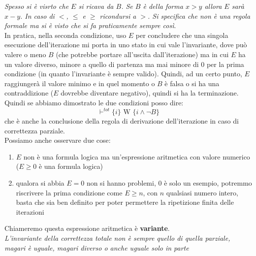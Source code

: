 \documentclass[a4paper,12pt, oneside]{book}
\begin{document}
\textit{Spesso si è visrto che $E$ si ricava da $B$. Se $B$ è della forma $x>y$ 
allora $E$ sarà $x-y$. In caso di $<$, $\leq$ e $\geq$ ricondursi a $>$. Si 
specifica che non è una regola formale ma si è visto che si fa praticamente 
sempre così}.\\
In pratica, nella seconda condizione, uso $E$ per concludere che una singola
esecuzione dell'iterazione mi porta in uno stato in cui vale l'invariante, dove
può valere o meno $B$ (che potrebbe portare all'uscita dall'iterazione) ma in
cui $E$ ha un valore diverso, minore a quello di partenza ma mai minore di 0 per
la prima condizione (in quanto l'invariante è sempre valido). Quindi, ad un
certo punto, $E$ raggiungerà il valore minimo e in quel momento o $B$ è falsa o
si ha una contraddizione ($E$ dovrebbe diventare negativo), quindi si ha la
terminazione. \\
Quindi se abbiamo dimostrato le due condizioni posso dire:
\[\vdash^{tot}\{i\}\mbox{ W }\{i\land\neg B\}\]
che è anche la conclusione della regola di derivazione dell'iterazione in caso
di correttezza parziale.\\
Possiamo anche osservare due cose:
\begin{enumerate}
  \item $E$ non è una formula logica ma un'espressione aritmetica con valore
  numerico ($E\geq 0$ è una formula logica)
  \item qualora si abbia $E=0$ non si hanno problemi, $0$ è solo un esempio,
  potremmo riscrivere la prima condizione come $E\geq n$, con $n$ qualsiasi
  numero intero, basta che sia ben definito per poter permettere la ripetizione
  finita delle iterazioni
\end{enumerate}
Chiameremo questa espressione aritmetica è \textbf{variante}.\\
\textit{L'invariante della correttezza totale non è sempre quello di quella
  parziale, magari è uguale, magari diverso o anche uguale solo in parte}
\end{document}
